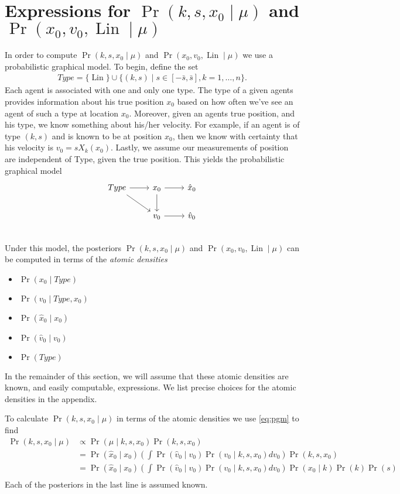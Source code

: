 \documentclass[12pt]{amsart}
\DeclareMathOperator{\Lin}{Lin}
\begin{document}
\section{Expressions for $\Pr( k,s,x_0 \mid \mu)$ and $\Pr( x_0, v_0, \Lin \mid \mu)$}
In order to compute $\Pr( k,s,x_0 \mid \mu)$ and $\Pr( x_0, v_0, \Lin \mid \mu)$ we use a probabilistic graphical model.
To begin, define the set
\begin{align*}
	Type = \{ \Lin \} \cup \{ (k,s) \mid s \in [-\bar{s}, \bar{s}] , k = 1,\dots,n\}.
\end{align*}
Each agent is associated with one and only one type.
The type of a given agents provides information about his true position $x_0$ based on how often we've see an agent of such a type at location $x_0$.
Moreover, given an agents true position, and his type, we know something about his/her velocity.
For example, if an agent is of type $(k,s)$ and is known to be at position $x_0$, then we know with certainty that his velocity is $v_0 = sX_k(x_0)$.
Lastly, we assume our measurements of position are independent of Type, given the true position.
This yields the probabilistic graphical model
\begin{equation}
\begin{tikzcd}
	Type \arrow[r] \arrow[rd] & x_0 \arrow[d] \arrow[r] & \hat{x}_0 \\
	 & v_0 \ar[r] & \hat{v}_0 \\
\end{tikzcd}
\label{eq:pgm}
\end{equation}
Under this model, the posteriors $\Pr( k,s,x_0 \mid \mu)$ and $\Pr( x_0, v_0, \Lin \mid \mu)$ can be computed in terms of the \emph{atomic densities}
\begin{itemize}
	\item $\Pr( x_0 \mid Type )$
	\item $\Pr( v_0 \mid Type,x_0)$
	\item $\Pr( \hat{x}_0 \mid x_0)$
	\item $\Pr( \hat{v}_0 \mid v_0)$
	\item $\Pr(Type)$
\end{itemize}
In the remainder of this section, we will assume that these atomic densities are known, and easily computable, expressions.
We list precise choices for the atomic densities in the appendix.

To calculate $\Pr(k,s,x_0 \mid \mu )$ in terms of the atomic densities we use \eqref{eq:pgm} to find
\begin{align*}
	\Pr( k,s,x_0 \mid \mu ) &\propto \Pr( \mu \mid k,s,x_0) \Pr( k,s,x_0) \\
		&= \Pr( \hat{x}_0 \mid x_0) \left(  \int \Pr( \hat{v}_0 \mid v_0 ) \Pr( v_0 \mid k,s,x_0) dv_0 \right) \Pr(k,s,x_0) \\
		&=  \Pr( \hat{x}_0 \mid x_0) \left(  \int \Pr( \hat{v}_0 \mid v_0 ) \Pr( v_0 \mid k,s,x_0) dv_0 \right) \Pr(x_0 \mid k) \Pr(k) \Pr(s) \\
\end{align*}
Each of the posteriors in the last line is assumed known. 
\end{document}
